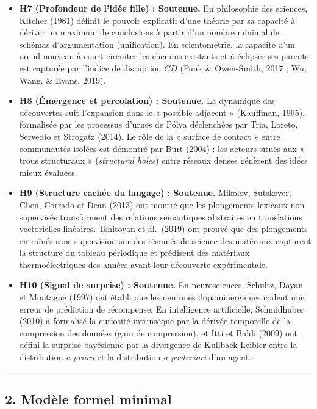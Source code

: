 \documentclass[a4paper,11pt]{article}
\begin{document}
\begin{itemize}
\item
  \textbf{H7 (Profondeur de l'idée fille) : Soutenue.} En philosophie
  des sciences, Kitcher (1981) définit le pouvoir explicatif d'une
  théorie par sa capacité à dériver un maximum de conclusions à partir
  d'un nombre minimal de schémas d'argumentation (unification). En
  scientométrie, la capacité d'un nœud nouveau à court-circuiter les
  chemins existants et à éclipser ses parents est capturée par l'indice
  de disruption \(CD\) (Funk \& Owen-Smith, 2017 ; Wu, Wang, \& Evans,
  2019).
\item
  \textbf{H8 (Émergence et percolation) : Soutenue.} La dynamique des
  découvertes suit l'expansion dans le « possible adjacent » (Kauffman,
  1995), formalisée par les processus d'urnes de Pólya déclenchées par
  Tria, Loreto, Servedio et Strogatz (2014). Le rôle de la « surface de
  contact » entre communautés isolées est démontré par Burt (2004) : les
  acteurs situés aux « trous structuraux » (\emph{structural holes})
  entre réseaux denses génèrent des idées mieux évaluées.
\item
  \textbf{H9 (Structure cachée du langage) : Soutenue.} Mikolov,
  Sutskever, Chen, Corrado et Dean (2013) ont montré que les plongements
  lexicaux non supervisés transforment des relations sémantiques
  abstraites en translations vectorielles linéaires. Tshitoyan et
  al.~(2019) ont prouvé que des plongements entraînés sans supervision
  sur des résumés de science des matériaux capturent la structure du
  tableau périodique et prédisent des matériaux thermoélectriques des
  années avant leur découverte expérimentale.
\item
  \textbf{H10 (Signal de surprise) : Soutenue.} En neurosciences,
  Schultz, Dayan et Montague (1997) ont établi que les neurones
  dopaminergiques codent une erreur de prédiction de récompense. En
  intelligence artificielle, Schmidhuber (2010) a formalisé la curiosité
  intrinsèque par la dérivée temporelle de la compression des données
  (gain de compression), et Itti et Baldi (2009) ont défini la surprise
  bayésienne par la divergence de Kullback-Leibler entre la distribution
  \emph{a priori} et la distribution \emph{a posteriori} d'un agent.
\end{itemize}

\begin{center}\rule{0.5\linewidth}{0.5pt}\end{center}

\subsection*{2. Modèle formel minimal}
\end{document}

